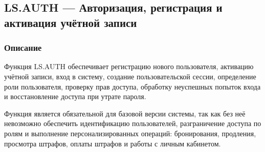 \documentclass[12pt,a4paper]{article}
\begin{document}
	\subsection{LS.AUTH --- Авторизация, регистрация и активация учётной записи}
	
	\subsubsection{Описание} 
	
	Функция LS.AUTH обеспечивает регистрацию нового пользователя, активацию учётной записи, вход в систему, создание пользовательской сессии, определение роли пользователя, проверку прав доступа, обработку неуспешных попыток входа и восстановление доступа при утрате пароля. 
	
	Функция является обязательной для базовой версии системы, так как без неё невозможно обеспечить идентификацию пользователей, разграничение доступа по ролям и выполнение персонализированных операций: бронирования, продления, просмотра штрафов, оплаты штрафов и работы с личным кабинетом.
	
\end{document}
